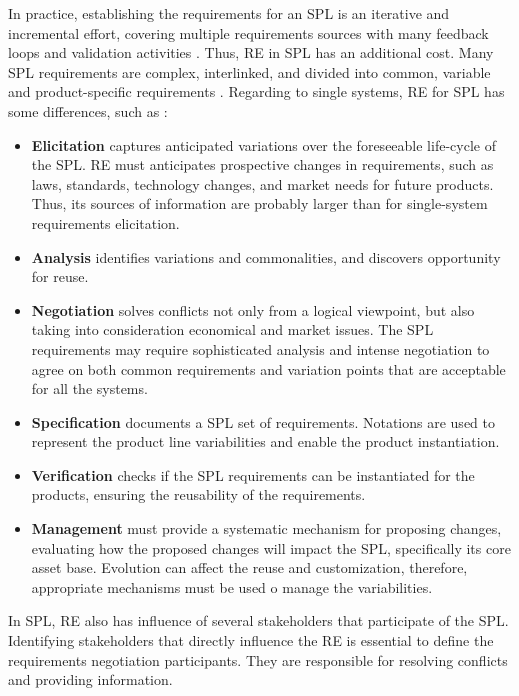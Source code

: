 In practice, establishing the requirements for an \ac{SPL} is an iterative and
incremental effort, covering multiple requirements sources with many feedback loops and validation activities 
\citep{chastek2001product}. Thus, \acf{RE} in \ac{SPL} has an
additional cost. Many \ac{SPL} requirements are complex, interlinked, and divided
into common, variable and product-specific requirements \citep{birk2003report, 
de2014defining}. Regarding to single systems, \ac{RE} for \ac{SPL} has
some differences, such as \citep{clements2002software,
Pohl2005, thurimella2007evolution}:

\begin{itemize}
\item \textbf{Elicitation} captures anticipated variations over the foreseeable life-cycle of the 
\ac{SPL}. \ac{RE} must anticipates prospective changes in requirements, such as
laws, standards, technology changes, and market needs for future products. Thus, its sources of information are probably larger 
than for single-system requirements elicitation.
\item \textbf{Analysis} identifies variations and commonalities, and discovers opportunity for reuse.
\item \textbf{Negotiation} solves conflicts not only from a logical viewpoint, but also taking into 
consideration economical and market issues. The \ac{SPL} requirements may
require sophisticated analysis and intense negotiation to agree on both common requirements and variation 
points that are acceptable for all the systems.
\item \textbf{Specification} documents a \ac{SPL} set of requirements. Notations are used to represent the 
product line variabilities and enable the product instantiation.
\item \textbf{Verification} checks if the \ac{SPL} requirements can be instantiated for the products, 
ensuring the reusability of the requirements.
\item \textbf{Management} must provide a systematic mechanism for proposing changes, evaluating how the 
proposed changes will impact the \ac{SPL}, specifically its core asset base. Evolution can affect the reuse and 
customization, therefore, appropriate mechanisms must be used o manage the variabilities.
\end{itemize}

In \ac{SPL}, \ac{RE} also has influence of several stakeholders that participate
of the \ac{SPL}. Identifying stakeholders that directly influence the \ac{RE} is
essential to define the requirements negotiation participants. They are responsible for 
resolving conflicts and providing information. 

